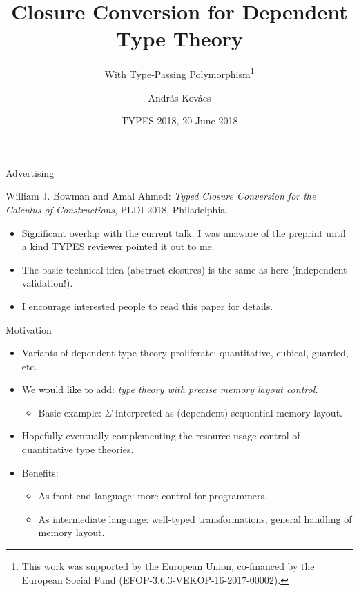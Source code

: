 \documentclass{beamer}
\title{Closure Conversion for Dependent Type Theory}
\subtitle{With Type-Passing Polymorphism\thanks{This work was supported by the European Union, co-financed by the European
Social Fund (EFOP-3.6.3-VEKOP-16-2017-00002).}}
\author{András Kovács}
\institute{Eötvös Loránd University, Budapest}
\date{TYPES 2018, 20 June 2018}
\begin{document}
\frame{\titlepage}
\logo{\vspace{3em}}


\begin{frame}{Advertising}


William J. Bowman and Amal Ahmed: \emph{Typed Closure Conversion for the Calculus of Constructions}, PLDI 2018, Philadelphia.

\begin{itemize}
\item
Significant overlap with the current talk. I was unaware of the
preprint until a kind TYPES reviewer pointed it out to me.
\item
The basic technical idea (abstract closures) is the same as here (independent validation!).
\item
I encourage interested people to read this paper for details.
\end{itemize}

\end{frame}

\begin{frame}{Motivation}
  \begin{itemize}
  \item
    Variants of dependent type theory proliferate: quantitative, cubical, guarded, etc.
  \item
    We would like to add: \emph{type theory with precise memory layout control.}
    \begin{itemize} \item Basic example: $\Sigma$ interpreted as (dependent) sequential memory layout.
    \end{itemize}
  \item
    Hopefully eventually complementing the resource usage control of quantitative
    type theories.
  \item Benefits:
    \begin{itemize}
    \item As front-end language: more control for programmers.
    \item As intermediate language: well-typed transformations, general handling of memory layout.
    \end{itemize}
  \end{itemize}
\end{frame}
\end{document}
